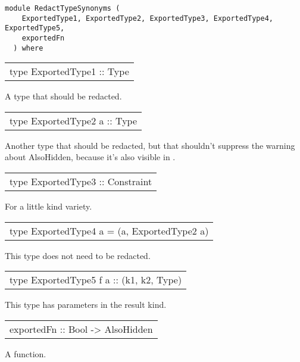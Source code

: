 \label{module:RedactTypeSynonyms}
\haddockbeginheader
{\haddockverb\begin{verbatim}
module RedactTypeSynonyms (
    ExportedType1, ExportedType2, ExportedType3, ExportedType4, ExportedType5,
    exportedFn
  ) where\end{verbatim}}
\haddockendheader

\begin{haddockdesc}
\item[\begin{tabular}{@{}l}
type ExportedType1 :: Type
\end{tabular}]
{\haddockbegindoc
A type that should be redacted.\par}
\end{haddockdesc}
\begin{haddockdesc}
\item[\begin{tabular}{@{}l}
type ExportedType2 a :: Type
\end{tabular}]
{\haddockbegindoc
Another type that should be redacted, but that shouldn't suppress the
 warning about AlsoHidden, because it's also visible in .\par}
\end{haddockdesc}
\begin{haddockdesc}
\item[\begin{tabular}{@{}l}
type ExportedType3 :: Constraint
\end{tabular}]
{\haddockbegindoc
For a little kind variety.\par}
\end{haddockdesc}
\begin{haddockdesc}
\item[\begin{tabular}{@{}l}
type ExportedType4 a = (a, ExportedType2 a)
\end{tabular}]
{\haddockbegindoc
This type does not need to be redacted.\par}
\end{haddockdesc}
\begin{haddockdesc}
\item[\begin{tabular}{@{}l}
type ExportedType5 f a :: (k1, k2, Type)
\end{tabular}]
{\haddockbegindoc
This type has parameters in the result kind.\par}
\end{haddockdesc}
\begin{haddockdesc}
\item[\begin{tabular}{@{}l}
exportedFn :: Bool -> AlsoHidden
\end{tabular}]
{\haddockbegindoc
A function.\par}
\end{haddockdesc}